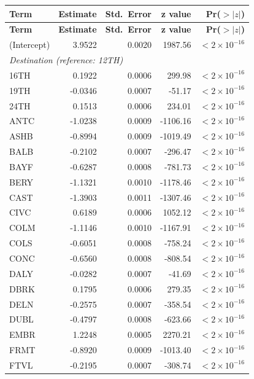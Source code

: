 \documentclass[11pt, letterpaper]{article}
\begin{document}
\begin{longtable}{lrrrr}
\hline
\textbf{Term} & \textbf{Estimate} & \textbf{Std.\ Error} & \textbf{z value} & \textbf{Pr($>|z|$)} \\
\hline
\endfirsthead
\hline
\textbf{Term} & \textbf{Estimate} & \textbf{Std.\ Error} & \textbf{z value} & \textbf{Pr($>|z|$)} \\
\hline
\endhead
\hline
\endfoot
(Intercept)            &  3.9522 & 0.0020 &  1987.56 & $<2\times10^{-16}$ \\
\hline
\multicolumn{5}{l}{\textit{Destination (reference: 12TH)}} \\
16TH  &  0.1922 & 0.0006 &  299.98 & $<2\times10^{-16}$ \\
19TH  & -0.0346 & 0.0007 &  -51.17 & $<2\times10^{-16}$ \\
24TH  &  0.1513 & 0.0006 &  234.01 & $<2\times10^{-16}$ \\
ANTC  & -1.0238 & 0.0009 & -1106.16 & $<2\times10^{-16}$ \\
ASHB  & -0.8994 & 0.0009 & -1019.49 & $<2\times10^{-16}$ \\
BALB  & -0.2102 & 0.0007 &  -296.47 & $<2\times10^{-16}$ \\
BAYF  & -0.6287 & 0.0008 &  -781.73 & $<2\times10^{-16}$ \\
BERY  & -1.1321 & 0.0010 & -1178.46 & $<2\times10^{-16}$ \\
CAST  & -1.3903 & 0.0011 & -1307.46 & $<2\times10^{-16}$ \\
CIVC  &  0.6189 & 0.0006 &  1052.12 & $<2\times10^{-16}$ \\
COLM  & -1.1146 & 0.0010 & -1167.91 & $<2\times10^{-16}$ \\
COLS  & -0.6051 & 0.0008 &  -758.24 & $<2\times10^{-16}$ \\
CONC  & -0.6560 & 0.0008 &  -808.54 & $<2\times10^{-16}$ \\
DALY  & -0.0282 & 0.0007 &   -41.69 & $<2\times10^{-16}$ \\
DBRK  &  0.1795 & 0.0006 &   279.35 & $<2\times10^{-16}$ \\
DELN  & -0.2575 & 0.0007 &  -358.54 & $<2\times10^{-16}$ \\
DUBL  & -0.4797 & 0.0008 &  -623.66 & $<2\times10^{-16}$ \\
EMBR  &  1.2248 & 0.0005 &  2270.21 & $<2\times10^{-16}$ \\
FRMT  & -0.8920 & 0.0009 & -1013.40 & $<2\times10^{-16}$ \\
FTVL  & -0.2195 & 0.0007 &  -308.74 & $<2\times10^{-16}$ \\

\end{longtable}
\end{document}
